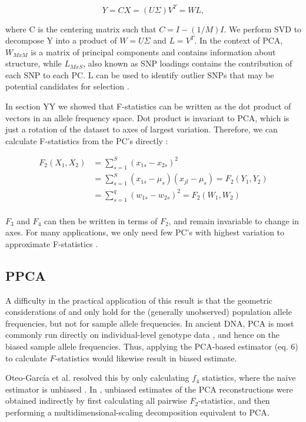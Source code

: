 \documentclass[12pt, letterpaper]{article}
\begin{document}
$$Y = CX = (U\Sigma ) V^T = WL,$$

where C is the centering matrix such that $C = I - (1/M)I$. We perform SVD to decompose Y into a product of $W = U\Sigma$ and $L = V^T$. In the context of PCA, $W_{MxM}$ is a matrix of principal components and contains information about structure, while $L_{MxS}$, also known as SNP loadings contains the contribution of each SNP to each PC. L can be used to identify outlier SNPs that may be potential candidates for selection \cite{gower_distance_1966}. 

In section YY we showed that F-statistics can be written as the dot product of vectors in an allele frequency space. Dot product is invariant to PCA, which is just a rotation of the dataset to axes of largest variation. Therefore, we can calculate F-statistics from the PC's directly \cite{peter_geometric_2022}:

\begin{align}\label{eq:f_pca}
F_2(X_1,X_2) &= \sum_{s=1}^S(x_{1s} - x_{2s})^2\nonumber\\
&= \sum_{s=1}^S(x_{1s} - \mu_s)(x_{jl} - \mu_s) = F_2(Y_1,Y_2)\nonumber\\
&= \sum_{s=1}^q(w_{1s} - w_{2s})^2 = F_2(W_1,W_2)\nonumber\\
\end{align}

$F_3$ and $F_4$ can then be written in terms of $F_2$, and remain invariable to change in axes. For many applications, we only need few PC's with highest variation to approximate F-statistics \cite{peter_geometric_2022}. 

\subsection{PPCA}
A difficulty in the practical application of this result is that the geometric considerations of \cite{oteo-garcia_geometrical_2021} and \cite{peter_geometric_2022} only hold for the (generally unobserved) population allele frequencies, but not for sample allele frequencies. In ancient DNA, PCA is most commonly run directly on individual-level genotype data \cite{patterson_population_2006}, and hence on the biased sample allele frequencies. Thus, applying the PCA-based estimator (eq. 6) to calculate $F$-statistics would likewise result in biased estimate.


Oteo-García et al. resolved this by only calculating $f_4$ statistics, where the naive estimator is unbiased \cite{oteo-garcia_geometrical_2021}. In \cite{peter_geometric_2022}, unbiased estimates of the PCA reconstructions were obtained indirectly by first calculating all pairwise $F_2$-statistics, and then performing a multidimensional-scaling decomposition equivalent to PCA. 
\end{document}
